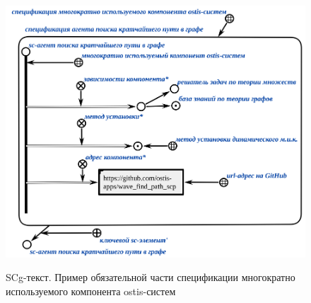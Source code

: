 \begin{figure}[H]
	\caption{SCg-текст. Пример обязательной части спецификации многократно используемого компонента ostis-систем}
	\includegraphics[scale=0.5]{author/part5/figures/component_required_specification_example.png}
	\label{fig:component_required_specification_example}
\end{figure}

